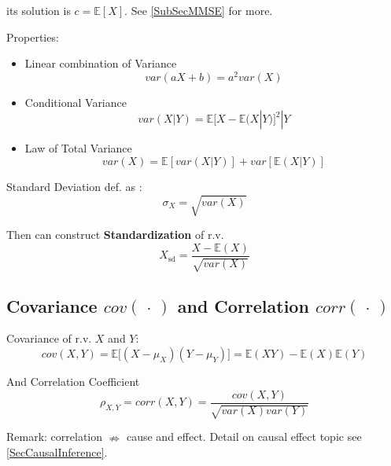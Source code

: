     its solution is $ c=\mathbb{E}\left[ X \right]  $. See \autoref{SubSecMMSE} for more.

\begin{point}
    Properties:
\end{point}

\begin{itemize} 
    \item Linear combination of Variance\begin{equation}
        var(aX+b)=a^2var(X)
    \end{equation}
    \item Conditional Variance
    \begin{equation}
        var(X|Y)=\mathbb{E}{[X-\mathbb{E}(X|Y)]^2|Y}
    \end{equation}
    \item Law of Total Variance\begin{equation}
        var(X)=\mathbb{E}[var(X|Y)]+var[\mathbb{E}(X|Y)]
    \end{equation}
\end{itemize}

    Standard Deviation def. as :
    \begin{equation}\sigma_X=\sqrt{var(X)}\end{equation}

    Then can construct \textbf{Standardization} of r.v.
    \begin{equation}X_\mathrm{sd} =\frac{X-\mathbb{E}(X)}{\sqrt{var(X)}}\end{equation}


\subsection{Covariance $ cov(\, \cdot \, ) $ and Correlation $ corr(\, \cdot \, ) $}\label{SubSubSectionCovarianceAndCorrelation}
    Covariance of r.v. $X$ and $Y$:\begin{equation}
        cov(X,Y)=\mathbb{E}\big[(X-\mu_X)(Y-\mu_Y)\big]=\mathbb{E}(XY)-\mathbb{E}(X)\mathbb{E}(Y)
    \end{equation}

    And Correlation Coefficient
    \begin{equation}
        \rho_{X,Y}=corr(X,Y)=\frac{cov(X,Y)}{\sqrt{var(X)var(Y)}}
    \end{equation}

    Remark: correlation $\nRightarrow$ cause and effect. 
    Detail on causal effect topic see \autoref{SecCausalInference}.

